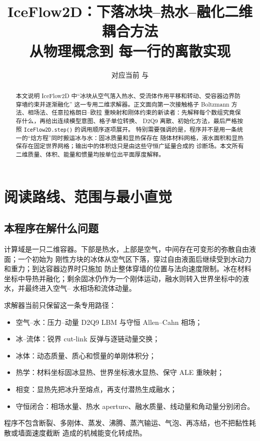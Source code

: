 \documentclass[UTF8,zihao=-4]{ctexart}
\title{IceFlow2D：下落冰块--热水--融化二维耦合方法\\
\large 从物理概念到 \code{step()} 每一行的离散实现}
\author{}
\date{对应当前 \code{iceflow2d/simulator.py} 与 \code{iceflow2d/config.py}}
\newcommand{\code}[1]{\texttt{#1}}
\numberwithin{equation}{section}
\begin{document}
\maketitle

\begin{abstract}
本文说明 IceFlow2D 中“冰块从空气落入热水、受流体作用平移和转动、受容器边界防穿墙约束并逐渐融化”
这一专用二维求解器。正文面向第一次接触格子 Boltzmann 方法、相场法、任意拉格朗日--欧拉
重映射和刚体约束的新读者：先解释每个数组究竟保存什么，再给出连续模型意图、格子单位转换、
D2Q9 离散、初始化方法，最后严格按照 \code{IceFlow2D.step()} 的调用顺序逐项展开。
特别需要强调的是，程序并不是用一条统一的“焓方程”同时搬运冰与水：固冰质量和显热保存在
随体材料网格，液水面积和显热保存在固定世界网格；输出中的体积焓只是由这些守恒广延量合成的
诊断场。本文所有二维质量、体积、能量和惯量均按单位出平面厚度解释。
\end{abstract}

\tableofcontents
\clearpage

\section{阅读路线、范围与最小直觉}

\subsection{本程序在解什么问题}

计算域是一只二维容器。下部是热水，上部是空气，中间存在可变形的弥散自由液面；一个初始为
刚性方块的冰体从空气区下落，穿过自由液面后继续受到水动力和重力；到达容器边界时只施加
防止整体穿墙的位置与法向速度限制。冰在材料
坐标中导热并融化；剩余固冰仍作为一个刚体运动，融水则转入世界坐标中的液水，并最终进入空气--
水相场和流体动量。

求解器当前只保留这一条专用路径：
\begin{itemize}
  \item 空气--水：压力--动量 D2Q9 LBM 与守恒 Allen--Cahn 相场；
  \item 冰--流体：锐界 cut-link 反弹与逐链动量交换；
  \item 冰体：动态质量、质心和惯量的单刚体积分；
  \item 热学：材料坐标固冰显热、世界坐标液水显热、保守 ALE 重映射；
  \item 相变：显热先把冰升至熔点，再支付潜热生成融水；
  \item 守恒闭合：相场水量、热水 aperture、融水质量、线动量和角动量分别闭合。
\end{itemize}
程序不包含断裂、多刚体、蒸发、沸腾、蒸汽输运、气泡、再冻结，也不把黏性耗散或墙面速度截断
造成的机械能变化转成热。
\end{document}
